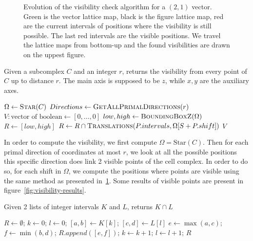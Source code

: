 \begin{figure}
  \centering
  
  \caption{Evolution of the visibility check algorithm for a $(2,1)$
    vector. Green is the vector lattice map, black is the figure
    lattice map, red are the current intervals of positions where
    the visibility is still possible. The last red intervals are
    the visible positions. We travel the lattice maps from
    bottom-up and the found visibilities are drawn on the
    uppest figure.}
  \label{fig:visibility-algorithm-evolution}
\end{figure}

\begin{algorithm}
  \caption{Given a subcomplex $C$ and an integer $r$, returns the visibility from every point of $C$ up to distance $r$. The main axis is supposed to be $z$, while $x,y$ are the auxiliary axes.}
  \label{alg:visibility}
  \begin{algorithmic}
    \State $\Omega \gets \Call{Star}{C}$ 
    \State $Directions \gets \Call{GetAllPrimalDirections}{r}$
    \State $V: \text{vector of boolean} \gets [0, \ldots, 0]$ 
    \State $low, high \gets \Call{BoundingBoxZ}{\Omega}$
    \State $R \gets [low, high]$
    \State $R \gets R \cap \Call{Translations}{P.intervals,\Omega[S + P.shift]}$
    \EndFor
    \State {}
    \EndFor
    \EndFor
    \State \Return $V$
    \EndFunction
  \end{algorithmic}
\end{algorithm}

In order to compute the visibility, we first compute $\Omega = \text{Star}(C)$. Then for each primal direction of
coordinates at most $r$, we look at all the possible positions this specific direction does link 2 visible points
of the cell complex. In order to do so, for each shift in $\Omega$, we compute the positions where points are
visible using the same method as presented in~\ref{fig:visibility-algorithm-evolution}. Some results of visible
points are present in figure~\ref{fig:visibility-results}.

\begin{algorithm}
  \caption{Given 2 lists of integer intervals $K$ and $L$, returns $K \cap L$}
  \label{alg:intersection}
  \begin{algorithmic}
    \State $R \gets \emptyset$; $k \gets 0$; $l \gets 0$;
    \State $[a,b] \gets K[k]$; $[c,d] \gets L[l]$
    \State $e \gets \max(a, c)$; $f \gets \min(b, d)$;
    $R.append([e, f])$;
    \EndIf
    $k \gets k+1$;
    \EndIf
    $l \gets l+1$;
    \EndIf
    \EndWhile
    \State \Return $R$
    \EndFunction
  \end{algorithmic}
\end{algorithm}

